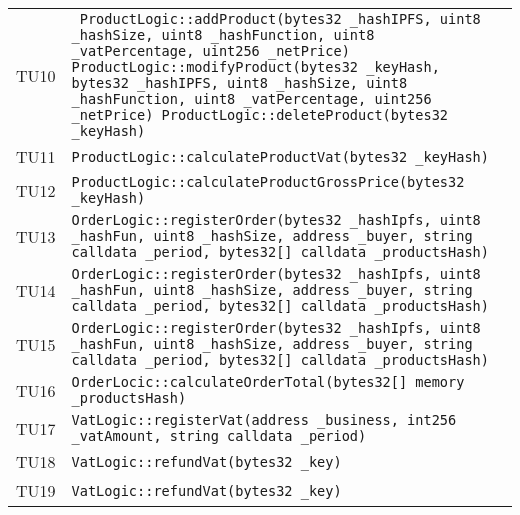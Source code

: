 \begin{longtable}{ >{\centering}p{} >{}p{}}
			\hypertarget{TU10}{TU10} & \texttt{ 
			ProductLogic::addProduct(bytes32 \_hashIPFS, uint8 \_hashSize, 
			uint8 \_hashFunction, uint8 \_vatPercentage, uint256 
			\_netPrice) \newline \newline
			ProductLogic::modifyProduct(bytes32 \_keyHash, 
			bytes32 \_hashIPFS, uint8 \_hashSize, uint8 \_hashFunction, uint8 
			\_vatPercentage, uint256 \_netPrice)\newline \newline
			ProductLogic::deleteProduct(bytes32 \_keyHash)}\\
			
			\hypertarget{TU11}{TU11} & 
			\texttt{ProductLogic::calculateProductVat(bytes32 \_keyHash)}\\
			
			\hypertarget{TU12}{TU12} & 
			\texttt{ProductLogic::calculateProductGrossPrice(bytes32 
			\_keyHash)}\\
		
			\hypertarget{TU13}{TU13} & 
			\texttt{OrderLogic::registerOrder(bytes32 \_hashIpfs, uint8 
			\_hashFun, uint8 \_hashSize, address \_buyer, string calldata 
			\_period, bytes32[] calldata \_productsHash)}\\
		
			\hypertarget{TU14}{TU14} & 
			\texttt{OrderLogic::registerOrder(bytes32 \_hashIpfs, uint8 
				\_hashFun, uint8 \_hashSize, address \_buyer, string calldata 
				\_period, bytes32[] calldata \_productsHash)}\\
			
			\hypertarget{TU15}{TU15} & 
			\texttt{OrderLogic::registerOrder(bytes32 \_hashIpfs, uint8 
				\_hashFun, uint8 \_hashSize, address \_buyer, string calldata 
				\_period, bytes32[] calldata \_productsHash)}\\
			
			\hypertarget{TU16}{TU16} & 
			\texttt{OrderLocic::calculateOrderTotal(bytes32[] memory 
			\_productsHash)}\\
			
			\hypertarget{TU17}{TU17} & \texttt{VatLogic::registerVat(address 
			\_business, int256 \_vatAmount, string calldata \_period)}\\
			
			\hypertarget{TU18}{TU18} & \texttt{VatLogic::refundVat(bytes32 
			\_key)}\\
			
			\hypertarget{TU19}{TU19} & \texttt{VatLogic::refundVat(bytes32 
				\_key)}\\
			

\end{longtable}
